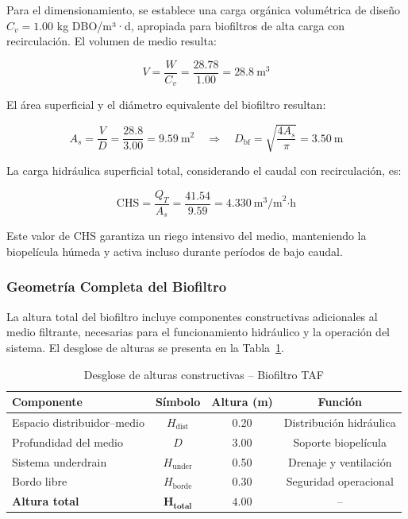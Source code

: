 \documentclass[12pt,a4paper]{article}
\begin{document}
Para el dimensionamiento, se establece una carga orgánica volumétrica de diseño $C_v = 1.00$ kg DBO/m³·d, apropiada para biofiltros de alta carga con recirculación. El volumen de medio resulta:

\begin{equation}
V = \frac{W}{C_v} = \frac{28.78}{1.00} = 28.8\ \text{m}^3
\end{equation}

El área superficial y el diámetro equivalente del biofiltro resultan:

\begin{equation}
A_s = \frac{V}{D} = \frac{28.8}{3.00} = 9.59\ \text{m}^2 \quad \Rightarrow \quad D_{\text{bf}} = \sqrt{\frac{4A_s}{\pi}} = 3.50\ \text{m}
\end{equation}

La carga hidráulica superficial total, considerando el caudal con recirculación, es:

\begin{equation}
\text{CHS} = \frac{Q_T}{A_s} = \frac{41.54}{9.59} = 4.330\ \text{m}^3\text{/m}^2\text{·h}
\end{equation}

Este valor de CHS garantiza un riego intensivo del medio, manteniendo la biopelícula húmeda y activa incluso durante períodos de bajo caudal.

\subsubsection*{Geometría Completa del Biofiltro}

La altura total del biofiltro incluye componentes constructivas adicionales al medio filtrante, necesarias para el funcionamiento hidráulico y la operación del sistema. El desglose de alturas se presenta en la Tabla~\ref{tab:alturas_taf}.

\begin{table}[H]
\centering
\caption{Desglose de alturas constructivas -- Biofiltro TAF}
\label{tab:alturas_taf}
\begin{tabular}{lccc}
\toprule
\textbf{Componente} & \textbf{Símbolo} & \textbf{Altura (m)} & \textbf{Función} \\
\midrule
Espacio distribuidor--medio & $H_{\text{dist}}$ & 0.20 & Distribución hidráulica \\
Profundidad del medio & $D$ & 3.00 & Soporte biopelícula \\
Sistema underdrain & $H_{\text{under}}$ & 0.50 & Drenaje y ventilación \\
Bordo libre & $H_{\text{borde}}$ & 0.30 & Seguridad operacional \\
\midrule
\textbf{Altura total} & $\mathbf{H_{\text{total}}}$ & $\mathbf{4.00}$ & -- \\
\bottomrule
\end{tabular}
\end{table}
\end{document}

